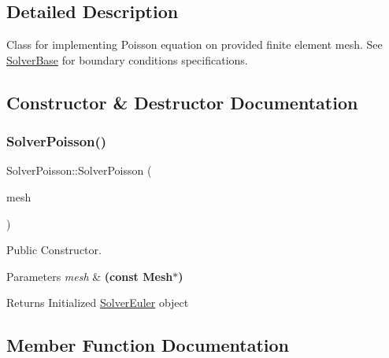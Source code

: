 \subsection{Detailed Description}
Class for implementing Poisson equation on provided finite element mesh. See \mbox{\hyperlink{class_solver_base}{Solver\+Base}} for boundary conditions specifications. 

\subsection{Constructor \& Destructor Documentation}
\mbox{\label{class_solver_poisson_a7e4c1e8605790e219590214893f916b5}} 
\subsubsection{\texorpdfstring{Solver\+Poisson()}{SolverPoisson()}}
{\footnotesize\ttfamily Solver\+Poisson\+::\+Solver\+Poisson (\begin{DoxyParamCaption}\item[{const \mbox{\hyperlink{class_f_e_mesh}{F\+E\+Mesh}} $\ast$}]{mesh }\end{DoxyParamCaption})\hspace{0.3cm}{\ttfamily [inline]}}



Public Constructor. 


\begin{DoxyParams}{Parameters}
{\em mesh} & {\bfseries (const Mesh$\ast$)} \\
\hline
\end{DoxyParams}
\begin{DoxyReturn}{Returns}
Initialized \mbox{\hyperlink{class_solver_euler}{Solver\+Euler}} object 
\end{DoxyReturn}


\subsection{Member Function Documentation}
\mbox{\label{class_solver_poisson_a1955e79999fcf055aebad5b15fda1563}} 
